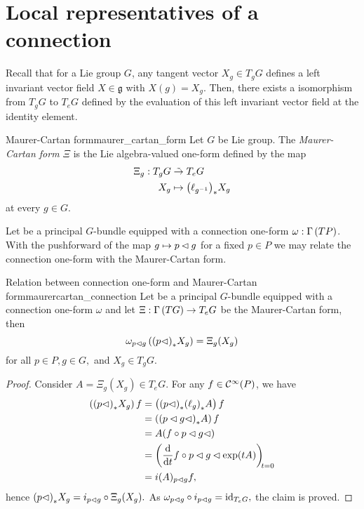 \section{Local representatives of a connection}
Recall that for a Lie group \(G\), any tangent vector \(X_g \in T_gG\) defines a left invariant vector field \(X \in \mathfrak{g}\) with \(X(g) = X_g\). Then, there exists a isomorphism from \(T_gG\) to \(T_eG\) defined by the evaluation of this left invariant vector field at the identity element.
\begin{definition}{Maurer-Cartan form}{maurer_cartan_form}
    Let \(G\) be Lie group. The \emph{Maurer-Cartan form \(\Xi\)} is the Lie algebra-valued one-form defined by the map
    \begin{align*}
        \Xi_g : T_gG &\mathrel{\tilde{\to}} T_eG\\
                 X_g &\mapsto {\left(\ell_{g^{-1}}\right)}_{\ast{}}X_g
    \end{align*}
    at every \(g \in G\).
\end{definition}

Let  be a principal \(G\)-bundle equipped with a connection one-form \(\omega : \Gamma\left(TP\right)\). With the pushforward of the map \(g \mapsto p\mathbin{\vartriangleleft} g\) for a fixed \(p \in P\) we may relate the connection one-form with the Maurer-Cartan form.
\begin{lemma}{Relation between connection one-form and Maurer-Cartan form}{maurercartan_connection}
    Let  be a principal \(G\)-bundle equipped with a connection one-form \(\omega\) and let \(\Xi : \Gamma\left(TG\right) \to T_eG\) be the Maurer-Cartan form, then
    \begin{equation*}
        \omega_{p\mathbin{\vartriangleleft} g}\left({(p\mathbin{\vartriangleleft})}_{\ast{}}{X_g}\right) = \Xi_g(X_g)
    \end{equation*}
    for all \(p \in P, g\in G,\) and \(X_g \in T_gG\).
\end{lemma}
\begin{proof}
    Consider \(A = \Xi_g(X_g) \in T_eG.\) For any \(f \in \mathcal{C}^\infty(P)\), we have
    \begin{align*}
        \left(\pf{(p\ract)}{X_g}\right)f &= \left(\pf{(p \ract)}{\pf{(\ell_g)}{A}}\right)f\\
                                                    &= \left(\pf{(p \ract g \ract)}{A}\right)f\\
                                                    &= A(f \circ p \ract g \ract)\\
                                                    &= \diff*{f \circ p \ract g \ract \exp(tA)}{t}[t=0]\\
                                                    &= i(A)_{p \ract g} f,
    \end{align*}
    hence \({(p\mathbin{\vartriangleleft})}_{\ast{}}{X_g} = i_{p \mathbin{\vartriangleleft} g} \circ \Xi_g(X_g).\) As \(\omega_{p \mathbin{\vartriangleleft} g} \circ i_{p \mathbin{\vartriangleleft} g} = \operatorname{id}_{T_eG},\) the claim is proved.
\end{proof}


